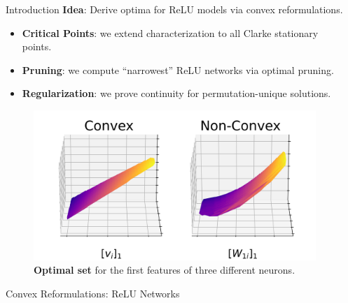 \documentclass[12pt, usenames, dvipsnames]{beamer}
\newlength{\sepwidth}
\newlength{\colwidth}
\newcommand{\separatorcolumn}{\begin{column}{\sepwidth}\end{column}}
\newcommand{\blue}[1]{\textcolor{CBBlue}{#1}}
\begin{document}
\begin{frame}[t]
	\begin{columns}[t]
		\separatorcolumn

		\begin{column}{\colwidth}
			\vspace{-1.5em}
			\begin{block}{Introduction}
				\large
				{
					\Large
					\blue{\textbf{Idea}}: Derive optima for ReLU models via convex reformulations.
				}

				\begin{itemize}
					\item \textbf{Critical Points}: we extend characterization to all Clarke stationary points.

					\item \textbf{Pruning}: we compute ``narrowest'' ReLU networks via optimal pruning.

					\item \textbf{Regularization}: we prove continuity for permutation-unique solutions.
				\end{itemize}

				\vspace{-1em}

				\begin{figure}[]
					\centering
					\includegraphics[width=.9\textwidth]{assets/solution_sets_vis_270.png}
					\caption{\textbf{Optimal set} for the first features of three different
						neurons.}
					\vspace{-1em}
					\label{fig:solution-sets}
				\end{figure}

			\end{block}

			\begin{block}{Convex Reformulations: ReLU Networks}

				\begin{columns}[t]
					\begin{column}{0.62\textwidth}


\end{column}
\end{columns}
\end{block}
\end{column}
\end{columns}
\end{frame}
\end{document}
